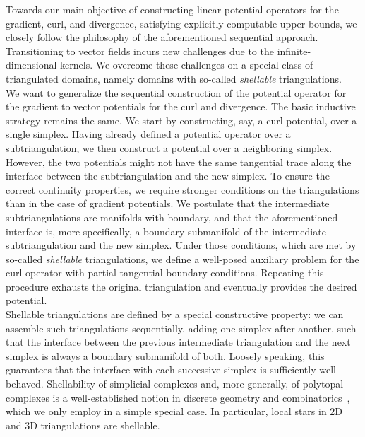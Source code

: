 \documentclass[12pt,a4paper]{article}
\begin{document}
Towards our main objective of constructing linear potential operators for the gradient, curl, and divergence, satisfying explicitly computable upper bounds, we closely follow the philosophy of the aforementioned sequential approach. Transitioning to vector fields incurs new challenges due to the infinite-dimensional kernels. We overcome these challenges on a special class of triangulated domains, namely domains with so-called \emph{shellable} triangulations. 
\\




We want to generalize the sequential construction of the potential operator for the gradient to vector potentials for the curl and divergence. The basic inductive strategy remains the same. We start by constructing, say, a curl potential, over a single simplex. Having already defined a potential operator over a subtriangulation, we then construct a potential over a neighboring simplex. However, the two potentials might not have the same tangential trace along the interface between the subtriangulation and the new simplex. 
% 
To ensure the correct continuity properties, we require stronger conditions on the triangulations than in the case of gradient potentials. We postulate that the intermediate subtriangulations are manifolds with boundary, and that the aforementioned interface is, more specifically, a boundary submanifold of the intermediate subtriangulation and the new simplex. Under those conditions, which are met by so-called \textit{shellable} triangulations, we define a well-posed auxiliary problem for the curl operator with partial tangential boundary conditions. Repeating this procedure exhausts the original triangulation and eventually provides the desired potential.
\\

Shellable triangulations are defined by a special constructive property:
we can assemble such triangulations sequentially, adding one simplex after another, such that the interface between the previous intermediate triangulation and the next simplex is always a boundary submanifold of both.
Loosely speaking, this guarantees that the interface with each successive simplex is sufficiently well-behaved.
Shellability of simplicial complexes and, more generally, of polytopal complexes is a well-established notion in discrete geometry and combinatorics~\cite{ziegler2012lectures}, which we only employ in a simple special case. 
In particular, local stars in 2D and 3D triangulations are shellable. 
\\
\end{document}
